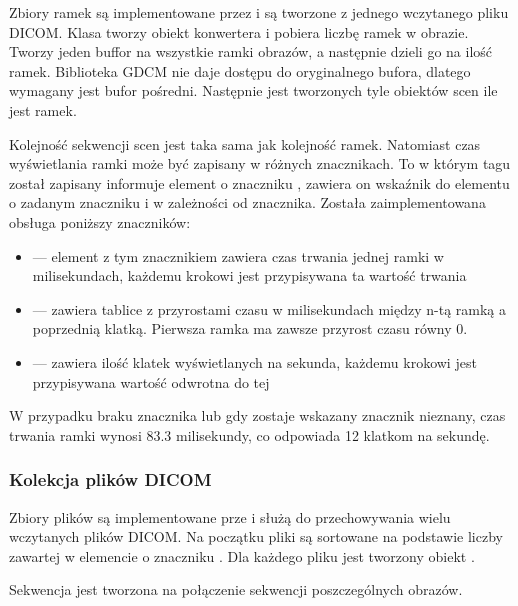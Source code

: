 \par
Zbiory ramek są implementowane przez  i są tworzone z jednego wczytanego pliku DICOM.
Klasa tworzy obiekt konwertera i pobiera liczbę ramek w obrazie.
Tworzy jeden buffor na wszystkie ramki obrazów, a następnie dzieli go na ilość ramek.
Biblioteka GDCM nie daje dostępu do oryginalnego bufora, dlatego wymagany jest bufor pośredni.
Następnie jest tworzonych tyle obiektów scen ile jest ramek.
\par
Kolejność sekwencji scen jest taka sama jak kolejność ramek.
Natomiast czas wyświetlania ramki może być zapisany w różnych znacznikach.
To w którym tagu został zapisany informuje element o znaczniku , zawiera on wskaźnik do elementu o zadanym znaczniku i w zależności od znacznika.
Została zaimplementowana obsługa poniższy znaczników:
\begin{itemize}
    \item {} --- element z tym znacznikiem zawiera czas trwania jednej ramki w milisekundach, każdemu krokowi jest przypisywana ta wartość trwania

    \item {} --- zawiera tablice z przyrostami czasu w milisekundach między n-tą ramką a poprzednią klatką. Pierwsza ramka ma zawsze przyrost czasu równy 0.
    
    \item {} --- zawiera ilość klatek wyświetlanych na sekunda, każdemu krokowi jest przypisywana wartość odwrotna do tej
\end{itemize}
W przypadku braku znacznika lub gdy zostaje wskazany znacznik nieznany, czas trwania ramki wynosi $83.3$ milisekundy, co odpowiada 12 klatkom na sekundę.


\subsubsection{Kolekcja plików DICOM}
\label{sec:sokar-dicomfileset}
\par
Zbiory plików są implementowane prze  i służą do przechowywania wielu wczytanych plików DICOM.
Na początku pliki są sortowane na podstawie liczby zawartej w elemencie o znaczniku .
Dla każdego pliku jest tworzony obiekt .
\par
Sekwencja jest tworzona na połączenie sekwencji poszczególnych obrazów.


